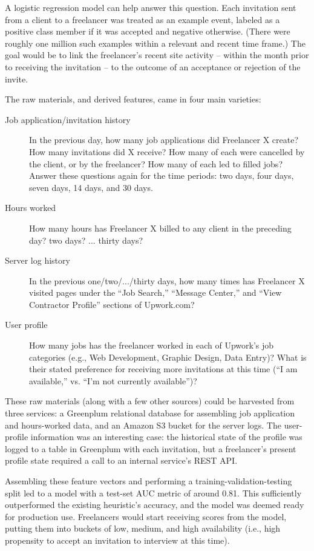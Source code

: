 \documentclass{article}
\begin{document}
 A logistic regression model can help answer this question. Each invitation sent
from a client to a freelancer was treated as an example event, labeled as a
positive class member if it was accepted and negative otherwise. (There were
roughly one million such examples within a relevant and recent time frame.) The
goal would be to link the freelancer's recent site activity -- within the month
prior to receiving the invitation -- to the outcome of an acceptance or
rejection of the invite.

The raw materials, and derived features, came in four main varieties:

\begin{description}
 \item[Job application/invitation history] In the previous day, how many job
applications did Freelancer X create? How many invitations did X receive? How
many of each were cancelled by the client, or by the freelancer? How many of
each led to filled jobs? Answer these questions again for the time periods: two
days, four days, seven days, 14 days, and 30 days.
 \item[Hours worked] How many hours has Freelancer X billed to any client in the
preceding day? two days? ... thirty days?
 \item[Server log history] In the previous one/two/.../thirty days, how many
times has Freelancer X visited pages under the ``Job Search,'' ``Message
Center,'' and ``View Contractor Profile'' sections of Upwork.com?
 \item[User profile] How many jobs has the freelancer worked in each of Upwork's
job categories (e.g., Web Development, Graphic Design, Data Entry)? What is
their stated preference for receiving more invitations at this time (``I am
available,'' vs. ``I'm not currently available'')?
\end{description}

 These raw materials (along with a few other sources) could be harvested from
three services: a Greenplum relational database for assembling job application
and hours-worked data, and an Amazon S3 bucket for the server logs. The
user-profile information was an interesting case: the historical state of the
profile was logged to a table in Greenplum with each invitation, but a
freelancer's present profile state required a call to an internal service's REST
API.

 Assembling these feature vectors and performing a training-validation-testing
split led to a model with a test-set AUC metric of around 0.81. This
sufficiently outperformed the existing heuristic's accuracy, and the model was
deemed ready for production use. Freelancers would start receiving scores from
the model, putting them into buckets of low, medium, and high availability
(i.e., high propensity to accept an invitation to interview at this time).
\end{document}
